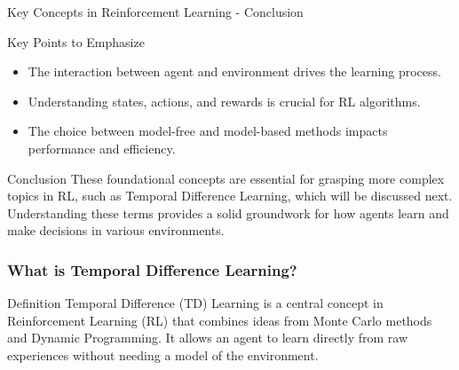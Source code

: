 \documentclass[aspectratio=169]{beamer}
\begin{document}
\begin{frame}[fragile]{Key Concepts in Reinforcement Learning - Conclusion}
    \begin{block}{Key Points to Emphasize}
        \begin{itemize}
            \item The interaction between agent and environment drives the learning process.
            \item Understanding states, actions, and rewards is crucial for RL algorithms.
            \item The choice between model-free and model-based methods impacts performance and efficiency.
        \end{itemize}
    \end{block}
    
    \begin{block}{Conclusion}
        These foundational concepts are essential for grasping more complex topics in RL, such as Temporal Difference Learning, which will be discussed next. Understanding these terms provides a solid groundwork for how agents learn and make decisions in various environments.
    \end{block}
\end{frame}

\begin{frame}[fragile]
    \frametitle{What is Temporal Difference Learning?}
    \begin{block}{Definition}
        Temporal Difference (TD) Learning is a central concept in Reinforcement Learning (RL) that combines ideas from Monte Carlo methods and Dynamic Programming. It allows an agent to learn directly from raw experiences without needing a model of the environment.
    \end{block}
\end{frame}
\end{document}
